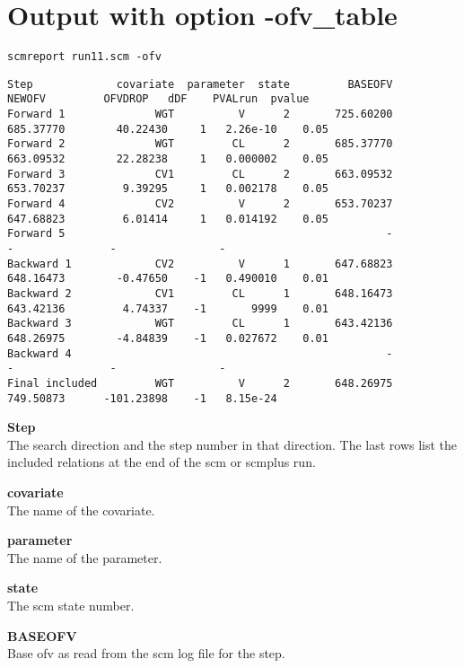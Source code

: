 \documentclass[hideglossary,notoc,hidelof,hidelot,hideTheSignaturePage,hideLinkCurrent,hideloa,pdfLatex,noClient,notitle,hideConfidential]{PMXstyle-20190820}
\begin{document}
\section{Output with option -ofv\_table}
\begin{verbatim}
scmreport run11.scm -ofv
\end{verbatim}
{\tiny
\begin{verbatim}
Step             covariate  parameter  state         BASEOFV          NEWOFV         OFVDROP   dDF    PVALrun  pvalue
Forward 1              WGT          V      2       725.60200       685.37770        40.22430     1   2.26e-10    0.05
Forward 2              WGT         CL      2       685.37770       663.09532        22.28238     1   0.000002    0.05
Forward 3              CV1         CL      2       663.09532       653.70237         9.39295     1   0.002178    0.05
Forward 4              CV2          V      2       653.70237       647.68823         6.01414     1   0.014192    0.05
Forward 5                                                  -               -               -                -        
Backward 1             CV2          V      1       647.68823       648.16473        -0.47650    -1   0.490010    0.01
Backward 2             CV1         CL      1       648.16473       643.42136         4.74337    -1       9999    0.01
Backward 3             WGT         CL      1       643.42136       648.26975        -4.84839    -1   0.027672    0.01
Backward 4                                                 -               -               -                -        
Final included         WGT          V      2       648.26975       749.50873      -101.23898    -1   8.15e-24        
\end{verbatim}
}



{\bfseries Step}\\
The search direction and the step number in that direction. The last rows list the included relations
at the end of the scm or scmplus run.

{\bfseries covariate}\\
The name of the covariate.

{\bfseries parameter}\\
The name of the parameter.

{\bfseries state}\\
The scm state number.

{\bfseries BASEOFV}\\
Base ofv as read from the scm log file for the step.
\end{document}
